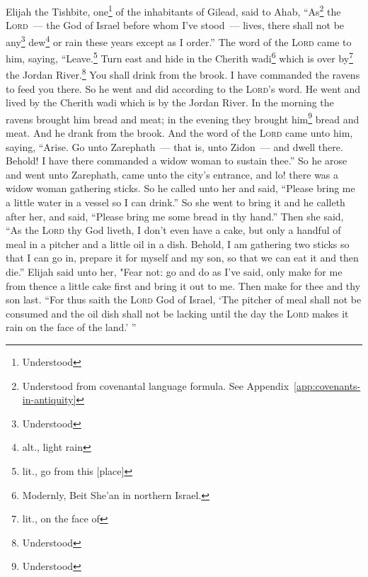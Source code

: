 
\begin{inparaenum}
     Elijah the Tishbite, one\footnote{Understood} of the inhabitants of Gilead, said to Ahab, ``As\footnote{Understood from covenantal language formula. See Appendix~\ref{app:covenants-in-antiquity}} the \textsc{Lord}~--- the God of Israel before whom I've stood~--- lives, there shall not be any\footnote{Understood} dew\footnote{alt., light rain} or rain these years except as I order.''%
     The word of the \textsc{Lord} came to him, saying,%
     ``Leave.\footnote{lit., go from this [place]} Turn east and hide in the Cherith wadi\footnote{Modernly, Beit She'an in northern Israel.} which is over by\footnote{lit., on the face of} the Jordan River.\footnote{Understood}%
     You shall drink from the brook. I have commanded the ravens to feed you there.%
     So he went and did according to the \textsc{Lord}'s word. He went and lived by the Cherith wadi which is by the Jordan River.%
     In the morning the ravens brought him bread and meat; in the evening they brought him\footnote{Understood} bread and meat. And he drank from the brook.%
     And the word of the \textsc{Lord} came unto him, saying,%
     ``Arise. Go unto Zarephath~--- that is, unto Zidon~--- and dwell there. Behold! I have there commanded a widow woman to sustain thee.''%
     So he arose and went unto Zarephath, came unto the city's entrance, and lo! there was a widow woman gathering sticks. So he called unto her and said, ``Please bring me a little water in a vessel so I can drink.''%
     So she went to bring it and he calleth after her, and said, ``Please bring me some bread in thy hand.''%
     Then she said, ``As the \textsc{Lord} thy God liveth, I don't even have a cake, but only a handful of meal in a pitcher and a little oil in a dish. Behold, I am gathering two sticks so that I can go in, prepare it for myself and my son, so that we can eat it and then die.''%
     Elijah said unto her, "Fear not: go and do as I've said, only make for me from thence a little cake first and bring it out to me. Then make for thee and thy son last.%
     ``For thus saith the \textsc{Lord} God of Israel, `The pitcher of meal shall not be consumed and the oil dish shall not be lacking until the day the \textsc{Lord} makes it rain on the face of the land.' ''%

\end{inparaenum}

